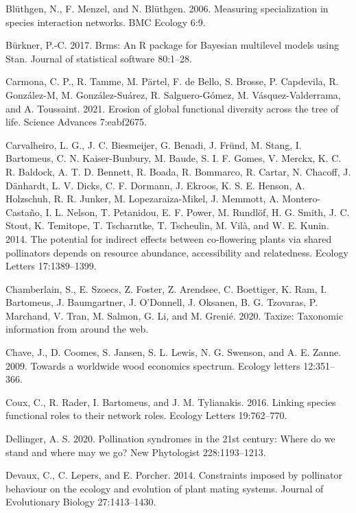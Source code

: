 \documentclass[11pt,a4paper,]{article}
\begin{document}
\hypertarget{ref-bluthgen2006}{}
Blüthgen, N., F. Menzel, and N. Blüthgen. 2006. Measuring specialization
in species interaction networks. BMC Ecology 6:9.

\hypertarget{ref-burkner2017}{}
Bürkner, P.-C. 2017. Brms: An R package for Bayesian multilevel models
using Stan. Journal of statistical software 80:1--28.

\hypertarget{ref-carmona2021}{}
Carmona, C. P., R. Tamme, M. Pärtel, F. de Bello, S. Brosse, P.
Capdevila, R. González-M, M. González-Suárez, R. Salguero-Gómez, M.
Vásquez-Valderrama, and A. Toussaint. 2021. Erosion of global functional
diversity across the tree of life. Science Advances 7:eabf2675.

\hypertarget{ref-carvalheiro2014}{}
Carvalheiro, L. G., J. C. Biesmeijer, G. Benadi, J. Fründ, M. Stang, I.
Bartomeus, C. N. Kaiser-Bunbury, M. Baude, S. I. F. Gomes, V. Merckx, K.
C. R. Baldock, A. T. D. Bennett, R. Boada, R. Bommarco, R. Cartar, N.
Chacoff, J. Dänhardt, L. V. Dicks, C. F. Dormann, J. Ekroos, K. S. E.
Henson, A. Holzschuh, R. R. Junker, M. Lopezaraiza-Mikel, J. Memmott, A.
Montero-Castaño, I. L. Nelson, T. Petanidou, E. F. Power, M. Rundlöf, H.
G. Smith, J. C. Stout, K. Temitope, T. Tscharntke, T. Tscheulin, M.
Vilà, and W. E. Kunin. 2014. The potential for indirect effects between
co-flowering plants via shared pollinators depends on resource
abundance, accessibility and relatedness. Ecology Letters 17:1389--1399.

\hypertarget{ref-chamberlain2020}{}
Chamberlain, S., E. Szoecs, Z. Foster, Z. Arendsee, C. Boettiger, K.
Ram, I. Bartomeus, J. Baumgartner, J. O'Donnell, J. Oksanen, B. G.
Tzovaras, P. Marchand, V. Tran, M. Salmon, G. Li, and M. Grenié. 2020.
Taxize: Taxonomic information from around the web.

\hypertarget{ref-chave2009}{}
Chave, J., D. Coomes, S. Jansen, S. L. Lewis, N. G. Swenson, and A. E.
Zanne. 2009. Towards a worldwide wood economics spectrum. Ecology
letters 12:351--366.

\hypertarget{ref-coux2016}{}
Coux, C., R. Rader, I. Bartomeus, and J. M. Tylianakis. 2016. Linking
species functional roles to their network roles. Ecology Letters
19:762--770.

\hypertarget{ref-dellinger2020}{}
Dellinger, A. S. 2020. Pollination syndromes in the 21st century: Where
do we stand and where may we go? New Phytologist 228:1193--1213.

\hypertarget{ref-devaux2014}{}
Devaux, C., C. Lepers, and E. Porcher. 2014. Constraints imposed by
pollinator behaviour on the ecology and evolution of plant mating
systems. Journal of Evolutionary Biology 27:1413--1430.
\end{document}
